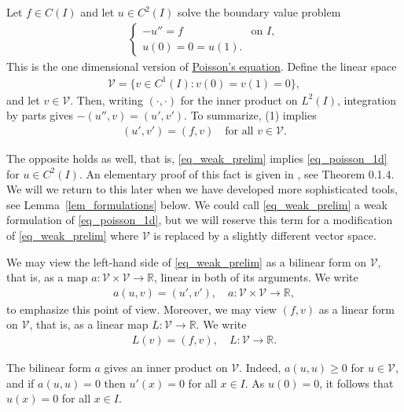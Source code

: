 \documentclass[12pt,oneside]{amsart}
\def\R{\mathbb R}
\begin{document}
Let $f \in C(I)$ and let $u \in C^2(I)$ solve the boundary value problem 
\begin{align}\label{eq_poisson_1d}
\begin{cases}
-u'' = f & \text{on $I$},
\\
u(0) = 0 = u(1).
\end{cases}\end{align}
This is the one dimensional version of \href{https://en.wikipedia.org/wiki/Poisson's_equation}{Poisson's equation}. Define the linear space
    \begin{align}\label{def_wrong_V}
\mathcal V = \{ v \in C^1(I) : v(0) = v(1) = 0 \},
    \end{align}
and let $v \in \mathcal V$. Then, writing $(\cdot, \cdot)$ for the inner product on $L^2(I)$, integration by parts gives $-(u'', v) = (u', v')$. To summarize, (1) implies
\begin{align}\label{eq_weak_prelim}
(u', v') = (f, v) \quad \text{for all $v \in \mathcal V$}. 
\end{align}

The opposite holds as well, that is, \eqref{eq_weak_prelim} implies \eqref{eq_poisson_1d} for $u \in C^2(I)$.
An elementary proof of this fact is given in \cite{BS}, see Theorem 0.1.4. We will we return to this later when we have developed more sophisticated tools, see Lemma~\ref{lem_formulations} below.
We could call \eqref{eq_weak_prelim} a weak formulation of \eqref{eq_poisson_1d}, but we will reserve this term for a modification of \eqref{eq_weak_prelim} where $\mathcal V$ is replaced by a slightly different vector space.  

We may view the left-hand side of \eqref{eq_weak_prelim} as a bilinear form on $\mathcal V$, that is, as a map $a: \mathcal V \times \mathcal V \to \R$, linear in both of its arguments.
We write  
    \begin{align}\label{def_a}
a(u, v) = (u', v'), \quad a : \mathcal V \times \mathcal V \to \mathbb R,
    \end{align}
to emphasize this point of view.   
Moreover, we may view $(f, v)$ as a linear form on $\mathcal V$, that is, as a linear map $L : \mathcal V \to \R$. We write 
    \begin{align}\label{def_L}
L(v) = (f,v), \quad L : \mathcal V \to \R.
    \end{align}


The bilinear form $a$ gives an inner product on $\mathcal V$. Indeed, $a(u,u) \ge 0$ for $u \in \mathcal V$, and if $a(u,u) = 0$ then $u'(x) = 0$ for all $x \in I$.
As $u(0) = 0$, it follows that $u(x) = 0$ for all $x \in I$.
\end{document}
